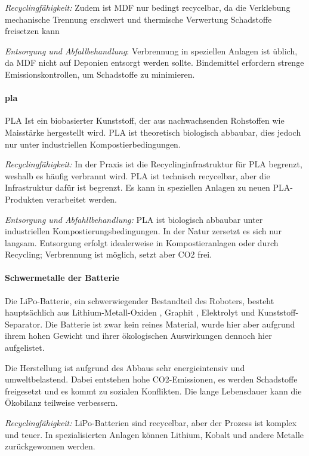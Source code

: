 \textit{Recyclingfähigkeit:}  Zudem ist MDF nur bedingt recycelbar, da die Verklebung mechanische Trennung erschwert und thermische Verwertung Schadstoffe freisetzen kann\cite{support-2024}

\textit{Entsorgung und Abfallbehandlung}: Verbrennung in speziellen Anlagen ist üblich, da MDF
nicht auf Deponien entsorgt werden sollte. Bindemittel erfordern strenge Emissionskontrollen, um Schadstoffe zu minimieren.\cite{mdf-entsorgung}


\paragraph{\acrlong{pla}}
PLA Ist ein biobasierter Kunststoff, der aus nachwachsenden Rohstoffen wie Maisstärke hergestellt wird. PLA ist theoretisch biologisch abbaubar, dies jedoch nur unter industriellen Kompostierbedingungen.

\textit{Recyclingfähigkeit:} In der Praxis ist die Recyclinginfrastruktur für PLA begrenzt, weshalb es häufig verbrannt wird. PLA ist technisch recycelbar, aber die Infrastruktur dafür ist begrenzt.
Es kann in speziellen Anlagen zu neuen PLA-Produkten verarbeitet werden. \cite{pla-recycling}

\textit{Entsorgung und Abfahllbehandlung:} PLA ist biologisch abbaubar unter industriellen Kompostierungsbedingungen. In der Natur zersetzt es sich nur langsam. Entsorgung erfolgt
idealerweise in Kompostieranlagen oder durch Recycling; Verbrennung ist möglich, setzt
aber CO2 frei.\cite{pla-details}


\paragraph{Schwermetalle der Batterie}

Die LiPo-Batterie, ein schwerwiegender Bestandteil des Roboters, besteht hauptsächlich aus Lithium-Metall-Oxiden , Graphit , Elektrolyt und Kunststoff-Separator. Die Batterie ist zwar kein reines Material, wurde hier aber aufgrund ihrem hohen Gewicht und ihrer ökologischen Auswirkungen dennoch hier aufgelistet.\cite{litio-akkus}

Die Herstellung ist aufgrund des Abbaus sehr energieintensiv und umweltbelastend. Dabei entstehen hohe CO2-Emissionen, es werden Schadstoffe freigesetzt und es kommt zu sozialen Konflikten. Die lange Lebensdauer kann die Ökobilanz teilweise verbessern.\cite{tezgoren}

\textit{Recyclingfähigkeit:} LiPo-Batterien sind recycelbar, aber der Prozess ist komplex und teuer. In spezialisierten Anlagen können Lithium, Kobalt und andere Metalle zurückgewonnen werden.\cite{regan-2023}


